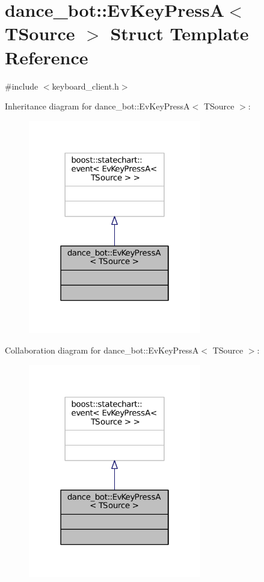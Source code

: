 \hypertarget{structdance__bot_1_1EvKeyPressA}{}\section{dance\+\_\+bot\+:\+:Ev\+Key\+PressA$<$ T\+Source $>$ Struct Template Reference}
\label{structdance__bot_1_1EvKeyPressA}


{\ttfamily \#include $<$keyboard\+\_\+client.\+h$>$}



Inheritance diagram for dance\+\_\+bot\+:\+:Ev\+Key\+PressA$<$ T\+Source $>$\+:
\nopagebreak
\begin{figure}[H]
\begin{center}
\leavevmode
\includegraphics[width=214pt]{structdance__bot_1_1EvKeyPressA__inherit__graph}
\end{center}
\end{figure}


Collaboration diagram for dance\+\_\+bot\+:\+:Ev\+Key\+PressA$<$ T\+Source $>$\+:
\nopagebreak
\begin{figure}[H]
\begin{center}
\leavevmode
\includegraphics[width=214pt]{structdance__bot_1_1EvKeyPressA__coll__graph}
\end{center}
\end{figure}


